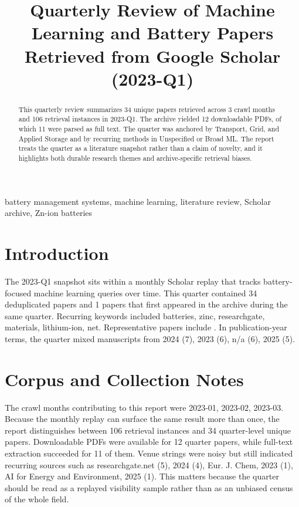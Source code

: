 \documentclass[conference]{IEEEtran}
\begin{document}
\title{ Quarterly Review of Machine Learning and Battery Papers Retrieved from Google Scholar (2023-Q1) }

\author{
}

\maketitle

\begin{abstract}
This quarterly review summarizes 34 unique papers retrieved across 3 crawl months and 106 retrieval instances in 2023-Q1. The archive yielded 12 downloadable PDFs, of which 11 were parsed as full text. The quarter was anchored by Transport, Grid, and Applied Storage and by recurring methods in Unspecified or Broad ML. The report treats the quarter as a literature snapshot rather than a claim of novelty, and it highlights both durable research themes and archive-specific retrieval biases.
\end{abstract}

\begin{IEEEkeywords}
battery management systems, machine learning, literature review, Scholar archive, Zn-ion batteries
\end{IEEEkeywords}

\section{Introduction}
The 2023-Q1 snapshot sits within a monthly Scholar replay that tracks battery-focused machine learning queries over time. This quarter contained 34 deduplicated papers and 1 papers that first appeared in the archive during the same quarter. Recurring keywords included batteries, zinc, researchgate, materials, lithium-ion, net. Representative papers include \cite{machinelearningdriven2025,recentadvancesin2025,aphysicsinspired2023,datadrivenapproaches2024}. In publication-year terms, the quarter mixed manuscripts from 2024 (7), 2023 (6), n/a (6), 2025 (5).

\section{Corpus and Collection Notes}
The crawl months contributing to this report were 2023-01, 2023-02, 2023-03. Because the monthly replay can surface the same result more than once, the report distinguishes between 106 retrieval instances and 34 quarter-level unique papers. Downloadable PDFs were available for 12 quarter papers, while full-text extraction succeeded for 11 of them. Venue strings were noisy but still indicated recurring sources such as researchgate.net (5), 2024 (4), Eur. J. Chem, 2023 (1), AI for Energy and Environment, 2025 (1). This matters because the quarter should be read as a replayed visibility sample rather than as an unbiased census of the whole field.
\end{document}
